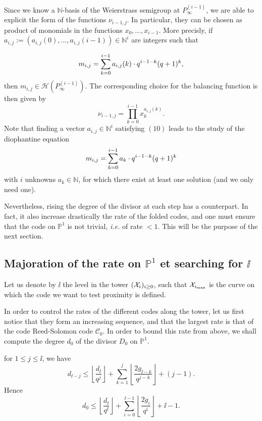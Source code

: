 \documentclass[10pt]{article}
\begin{document}
Since we know a $\mathbb{N}$-basis of the Weierstrass semigroup at $P_{\infty}^{(i-1)}$, we are able to explicit the form of the functions $\nu_{i-1,j}$. In particular, they can be chosen as product of monomials in the functions $x_0,...,x_{i-1}$. More precisly, if $a_{i,j} := (a_{i,j}(0),...,a_{i,j}(i-1)) \in \mathbb{N}^i$ are integers such that

\begin{equation}
m_{i,j} = \sum\limits_{k=0}^{i-1} a_{i,j}(k) \cdot q^{i-1-k}(q+1)^k,
\end{equation}
then $m_{i,j} \in \mathcal{H}\left(P_{\infty}^{(i-1)}\right)$. The corresponding choice for the balancing function is then given by 
\[ \nu_{i-1,j} = \prod\limits_{k=0}^{i-1} x_k^{a_{i,j}(k)}.\]
Note that finding a vector $a_{i,j} \in \mathbb{N}^i$ satisfying $(10)$ leads to the study of the diophantine equation
\[m_{i,j} = \sum\limits_{k=0}^{i-1} a_k \cdot q^{i-1-k}(q+1)^k\]
with $i$ unknowns $a_k \in \mathbb{N}$, for which there exist at least one solution (and we only need one).

Nevertheless, rising the degree of the divisor at each step has a counterpart. In fact, it also increase drastically the rate of the folded codes, and one must ensure that the code on $\mathbb{P}^1$ is not trivial, \textit{i.e.} of rate $< 1$. This will be the purpose of the next section. \\



\subsection{Majoration of the rate on $\mathbb{P}^1$ et searching for $\ii$}

Let us denote by $\ii$ the level in the tower $(\mathcal{X}_i)_{i\geq 0}$, such that $\mathcal{X}_{i_{\rm{max}}}$ is the curve on which the code we want to test proximity is defined.

In order to control the rates of the different codes along the tower, let us first notice that they form an increasing sequence, and that the largest rate is that of the code Reed-Solomon code $\mathcal{C}_0$. In order to bound this rate from above, we shall compute the degree $d_0$ of the divisor $D_0$ on $\mathbb{P}^1$. \\

\begin{lemma}\label{lem:deg_herm}
for $1 \leq j \leq \ii$, we have 
\[d_{\ii -j} \leq \left\lfloor \dfrac{d_{\ii}}{q^j}\right\rfloor + \sum\limits_{k=1}^j \left\lfloor \dfrac{2g_{\ii -k}}{q^{j-k}}\right\rfloor + (j-1).\]
Hence 
\[d_0 \leq \left\lfloor \dfrac{d_{\ii}}{q^{\ii}}\right\rfloor + \sum\limits_{i=0}^{\ii-1} \left\lfloor \dfrac{2g_i}{q^{i}}\right\rfloor + \ii-1.\]

\end{lemma}
\end{document}
